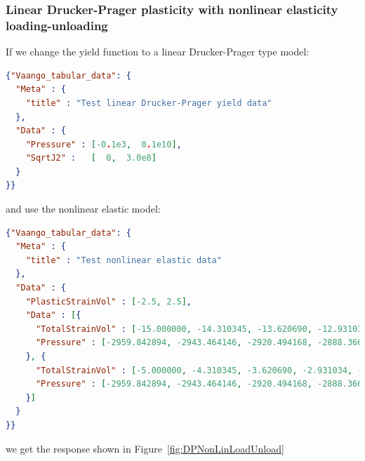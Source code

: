 \subsubsection{Linear Drucker-Prager plasticity with nonlinear elasticity loading-unloading} 
If we change the yield function to a linear Drucker-Prager type model:
\begin{lstlisting}[language=JSON]
{"Vaango_tabular_data": {
  "Meta" : {
    "title" : "Test linear Drucker-Prager yield data"
  },
  "Data" : {
    "Pressure" : [-0.1e3,  0.1e10],
    "SqrtJ2" :   [  0,  3.0e8]
  }
}}
\end{lstlisting}
and use the nonlinear elastic model:
\begin{lstlisting}[language=JSON]
{"Vaango_tabular_data": {
  "Meta" : {
    "title" : "Test nonlinear elastic data"
  },
  "Data" : {
    "PlasticStrainVol" : [-2.5, 2.5],
    "Data" : [{
      "TotalStrainVol" : [-15.000000, -14.310345, -13.620690, -12.931034, -12.241379, -11.551724, -10.862069, -10.172414, -9.482759, -8.793103, -8.103448, -7.413793, -6.724138, -6.034483, -5.344828, -4.655172, -3.965517, -3.275862, -2.586207, -1.896552, -1.206897, -0.517241, 0.172414, 0.862069, 1.551724, 2.241379, 2.931034, 3.620690, 4.310345, 5.000000],
      "Pressure" : [-2959.842894, -2943.464146, -2920.494168, -2888.366995, -2843.600634, -2781.548344, -2696.156593, -2579.811517, -2423.426002, -2217.004505, -1950.975669, -1618.496214, -1218.556435, -759.014896, -257.981931, 257.981931, 759.014896, 1218.556435, 1618.496214, 1950.975669, 2217.004505, 2423.426002, 2579.811517, 2696.156593, 2781.548344, 2843.600634, 2888.366995, 2920.494168, 2943.464146, 2959.842894]
    }, {
      "TotalStrainVol" : [-5.000000, -4.310345, -3.620690, -2.931034, -2.241379, -1.551724, -0.862069, -0.172414, 0.517241, 1.206897, 1.896552, 2.586207, 3.275862, 3.965517, 4.655172, 5.344828, 6.034483, 6.724138, 7.413793, 8.103448, 8.793103, 9.482759, 10.172414, 10.862069, 11.551724, 12.241379, 12.931034, 13.620690, 14.310345, 15.000000],
      "Pressure" : [-2959.842894, -2943.464146, -2920.494168, -2888.366995, -2843.600634, -2781.548344, -2696.156593, -2579.811517, -2423.426002, -2217.004505, -1950.975669, -1618.496214, -1218.556435, -759.014896, -257.981931, 257.981931, 759.014896, 1218.556435, 1618.496214, 1950.975669, 2217.004505, 2423.426002, 2579.811517, 2696.156593, 2781.548344, 2843.600634, 2888.366995, 2920.494168, 2943.464146, 2959.842894]
    }]
  }
}}
\end{lstlisting}
we get the response shown in Figure~\ref{fig:DPNonLinLoadUnload}

